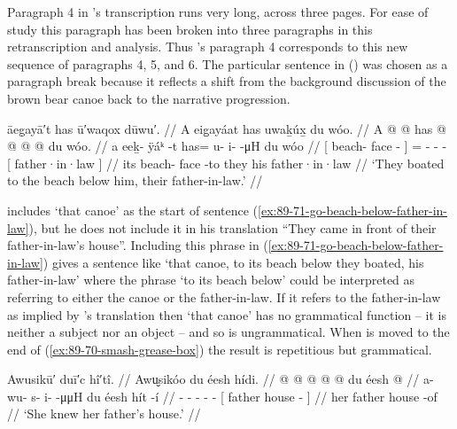 Paragraph 4 in \citeauthor{swanton:1909}’s transcription runs very long, across three pages.
For ease of study this paragraph has been broken into three paragraphs in this retranscription and analysis.
Thus \citeauthor{swanton:1909}’s paragraph 4 corresponds to this new sequence of paragraphs 4, 5, and 6.
The particular sentence in (\nextx) was chosen as a paragraph break because it reflects a shift from the background discussion of the brown bear canoe back to the narrative progression.

\ex\label{ex:89-71-go-beach-below-father-in-law}%
%
\begingl
	\glpreamble	āeg̣ayā′t has ū′waqox dūwu′. //
	\glpreamble	A eig̱ayáat has uwaḵúx̱ du wóo. //
	\gla	{} A  @ {} @ {} {}
		has @  @ {} @ {} @ {}
		{} du wóo. {} //
	\glb	{} a eeḵ- ÿáᵏ -t {}
		has= u- i-  -μH
		{} du wóo {} //
	\glc	{}[  beach- face - {}]
		= - -  -
		{}[  father·in·law {}] //
	\gld	{} its beach- face -to {}
		they  {} {} {}
		{} his father·in·law //
	\glft	‘They boated to the beach below him, their father-in-law.’
		//
\endgl
\xe

\citeauthor{swanton:1909} includes   ‘that canoe’ as the start of sentence (\ref{ex:89-71-go-beach-below-father-in-law}), but he does not include it in his translation “They came in front of their father-in-law’s house”.
Including this phrase in (\ref{ex:89-71-go-beach-below-father-in-law}) gives a sentence like ‘that canoe, to its beach below they boated, his father-in-law’ where the phrase  ‘to its beach below’ could be interpreted as referring to either the canoe or the father-in-law.
If it refers to the father-in-law as implied by \citeauthor{swanton:1909}’s translation then  ‘that canoe’ has no grammatical function – it is neither a subject nor an object – and so is ungrammatical.
When  is moved to the end of (\ref{ex:89-70-smash-grease-box}) the result is repetitious but grammatical.

\ex\label{ex:89-72-knew-fathers-house}%
%
\begingl
	\glpreamble	Awusikū′ duī′c hî′tî. //
	\glpreamble	Awu̬sikóo du éesh hídi. //
	\gla	{} @ {} @ {} @ {} @ {} @ {}
		{} du éesh  @ {} {} //
	\glb	a- wu- s- i-  -μμH
		{} du éesh hít -í {} //
	\glc	{}- - - -  -
		{}[  father house - {}] //
	\gld	{} {} {} {} {} {}
		{} her father house -of {} //
	\glft	‘She knew her father’s house.’
		//
\endgl
\xe

